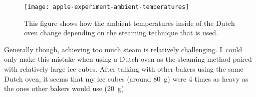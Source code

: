 \begin{figure}[ht]
  \texttt{[image: apple-experiment-ambient-temperatures]}
  \caption[Dutch Oven temperature versus steaming technique]{This figure shows
      how the ambient temperatures inside of the Dutch oven change depending
      on the steaming technique that is used.}%
  \label{apple-experiment-ambient-temperatures}
\end{figure}

Generally though, achieving too much steam is relatively challenging. I~could only
make this mistake when using a Dutch oven as the steaming method paired with relatively
large ice cubes. After talking with other bakers using the same Dutch oven, it seems
that my ice cubes (around \qty{80}{\gram}) were 4 times as heavy as the ones
other bakers would use (\qty{20}{\gram}).
